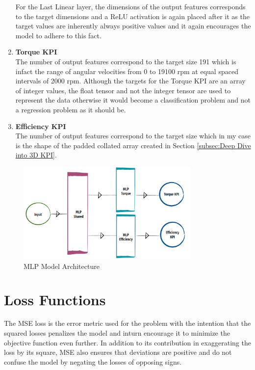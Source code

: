 \documentclass{report} %
\begin{document}
\begin{enumerate}
    For the Last Linear layer, the dimensions of the output features corresponds to the target dimensions and a \ac{ReLU} activation is again placed after it as the target values are inherently 
    always positive values and it again encourages the model to adhere to this fact.
    \item \textbf{Torque \ac{KPI}} \\
    The number of output features correspond to the target size 191 which is infact the range of angular velocities from 0 to 19100 rpm at equal spaced intervals of 2000 rpm.
    Although the targets for the Torque \ac{KPI} are an array of integer values, the float tensor and not the integer tensor are used to represent the data otherwise 
    it would become a classification problem and not a regression problem as it should be. 
    \item \textbf{Efficiency \ac{KPI}} \\
    The number of output features correspond to the target size which in my case is the shape of the padded collated array created in Section \ref{subsec:Deep Dive into 3D KPI}.
\end{enumerate}

\begin{figure}[H]
    \centering
    \includegraphics[width=0.8\textwidth]{./ReportImages/mlp_architecture.png} 
    \caption{\ac{MLP} Model Architecture}
    \label{fig:MLP Model Architecture}
\end{figure}

\section{Loss Functions}\label{sec:Loss Functions}
The \ac{MSE} loss is the error metric used for the problem with the intention that the squared losses penalizes the model and inturn encourage it to 
minimize the objective function even further. In addition to its contribution in exaggerating the loss by its square, \ac{MSE} also ensures that deviations are 
positive and do not confuse the model by negating the losses of opposing signs. 
\end{document}
